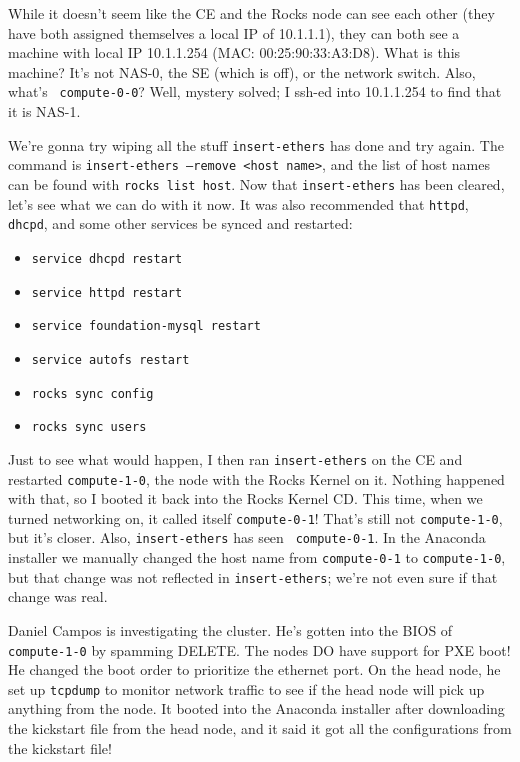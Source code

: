 \documentclass[12pt]{article}
\begin{document}
\qq While it doesn't seem like the CE and the Rocks node can see each other
(they have both assigned themselves a local IP of 10.1.1.1), they can both see a
machine with local IP 10.1.1.254 (MAC: 00:25:90:33:A3:D8). What is this machine?
It's not NAS-0, the SE (which is off), or the network switch. Also, what's {\tt
  compute-0-0}? Well, mystery solved; I ssh-ed into 10.1.1.254 to find that it
is NAS-1. 

\qq We're gonna try wiping all the stuff {\tt insert-ethers} has done and try
again. The command is {\tt insert-ethers --remove <host name>}, and the list of
host names can be found with {\tt rocks list host}. Now that {\tt insert-ethers}
has been cleared, let's see what we can do with it now. It was also recommended
that {\tt httpd}, {\tt dhcpd}, and some other services be synced and restarted:

\begin{itemize}
\item {\tt service dhcpd restart}
\item {\tt service httpd restart}
\item {\tt service foundation-mysql restart}
\item {\tt service autofs restart}
\item {\tt rocks sync config}
\item {\tt rocks sync users}
\end{itemize}

Just to see what would happen, I then ran {\tt insert-ethers} on the CE and
restarted {\tt compute-1-0}, the node with the Rocks Kernel on it. Nothing
happened with that, so I booted it back into the Rocks Kernel CD. This time,
when we turned networking on, it called itself {\tt compute-0-1}! That's still
not {\tt compute-1-0}, but it's closer. Also, {\tt insert-ethers} has seen {\tt
  compute-0-1}. In the Anaconda installer we manually changed the host name from
{\tt compute-0-1} to {\tt compute-1-0}, but that change was not reflected in
{\tt insert-ethers}; we're not even sure if that change was real.

\begin{tcolorbox}[title=RESOLUTION, colback=white, colframe=green!40!black]
Daniel Campos is investigating the cluster. He's gotten into the BIOS of
{\tt compute-1-0} by spamming DELETE. The nodes DO have support for
PXE boot! He changed the boot order to prioritize the ethernet port. On the head
node, he set up {\tt tcpdump} to monitor network traffic to see if the head node
will pick up anything from the node. It booted into the Anaconda installer after
downloading the kickstart file from the head node, and it said it got all the
configurations from the kickstart file!
\end{tcolorbox}
\end{document}
